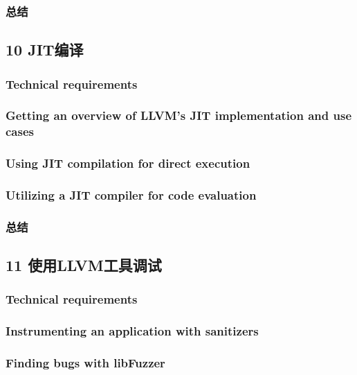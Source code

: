 \documentclass[11pt,a4paper,UTF8]{ctexart}
\begin{document}
		\subsubsection{总结}
	\subsection{10 JIT编译}
		\subsubsection{Technical requirements}
		\subsubsection{Getting an overview of LLVM's JIT implementation and use cases}
		\subsubsection{Using JIT compilation for direct execution}
		\subsubsection{Utilizing a JIT compiler for code evaluation}
		\subsubsection{总结}
	\subsection{11 使用LLVM工具调试}
		\subsubsection{Technical requirements}
		\subsubsection{Instrumenting an application with sanitizers}
		\subsubsection{Finding bugs with libFuzzer}
\end{document}
